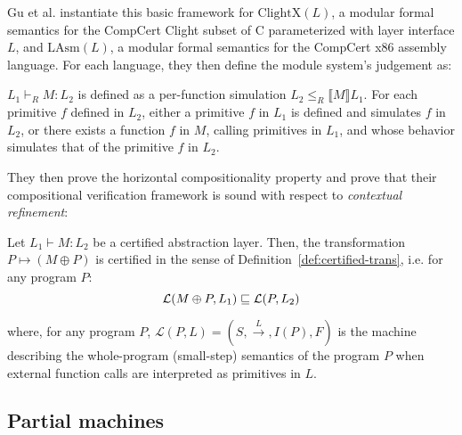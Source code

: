Gu et al. instantiate this basic framework for
$\text{ClightX}(L)$, a modular formal semantics for the CompCert
Clight subset of C parameterized with layer interface $L$, and
$\text{LAsm}(L)$, a modular formal semantics for the CompCert x86
assembly language. For each language, they then define
the module system's judgement as:
\begin{definition} \label{def:popl15-layers}
$L_1 \vdash_R M : L_2$ is defined as a per-function simulation
$L_2 \leqslant_R \llbracket M \rrbracket L_1$. For
  each primitive $f$ defined in $L_2$, either a primitive $f$ in $L_1$
  is defined and simulates $f$ in $L_2$, or there exists a function
  $f$ in $M$, calling primitives in $L_1$, and whose behavior
  simulates that of the primitive $f$ in $L_2$.
\end{definition}
They then prove the horizontal compositionality
property
and prove that their compositional
verification framework is sound with respect to \emph{contextual
  refinement}:

\begin{theorem}
Let $L_1 \vdash M : L_2$ be a certified abstraction layer. Then, the
transformation $P \mapsto (M \oplus P)$ is certified in the sense of
Definition~\ref{def:certified-trans}, i.e. for any program $P$:
\[ \mathcal{L}(M \oplus P, L_1) \sqsubseteq \mathcal{L}(P, L_2) \]
\end{theorem}
\noindent where, for any program 
{\small $P$, $\mathcal{L}(P, L) = (S,
\stackrel{L}{\rightarrow}, I(P), F)$} is the machine describing the
whole-program (small-step) semantics of the program $P$ when external
function calls are interpreted as primitives in $L$.

\subsection{Partial machines}

